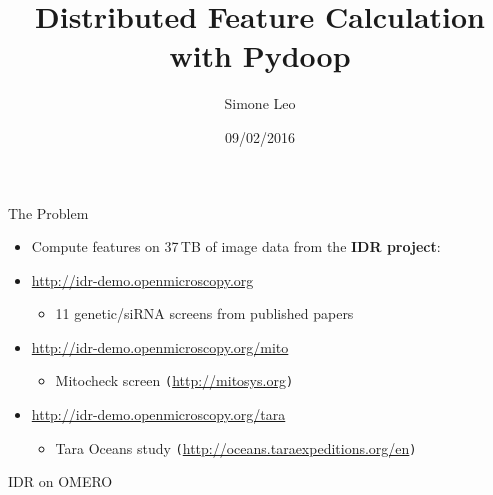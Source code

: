 \documentclass[compress]{beamer}
\institute{
OME Tuesday Meeting
}
\title{Distributed Feature Calculation with Pydoop}
\author{Simone Leo}
\date{09/02/2016}
\newcommand{\urlref}[1]{{\small \texttt{(}{\color{blue}\url{#1}}\texttt{)}}}
\begin{document}
\begin{frame}[plain]
  \titlepage{}
\end{frame}




\begin{frame}{The Problem}
\begin{center}
  \begin{itemize}
  \item Compute features on 37\,TB of image data from the {\bfseries
    IDR project}:
  \item {\color{blue} \url{http://idr-demo.openmicroscopy.org}}
    \begin{itemize}
    \item 11 genetic/siRNA screens from published papers
    \end{itemize}
  \item {\color{blue} \url{http://idr-demo.openmicroscopy.org/mito}}
    \begin{itemize}
    \item Mitocheck screen \urlref{http://mitosys.org}
    \end{itemize}
  \item {\color{blue} \url{http://idr-demo.openmicroscopy.org/tara}}
    \begin{itemize}
    \item Tara Oceans study \urlref{http://oceans.taraexpeditions.org/en}
    \end{itemize}
  \end{itemize}
\end{center}
\end{frame}

\begin{frame}{IDR on OMERO}
\begin{columns}
  \column{\dimexpr\paperwidth-10pt}
\end{columns}
\end{frame}
\end{document}

